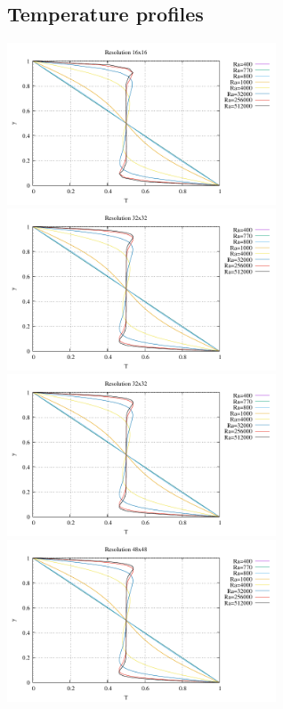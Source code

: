 \newpage
\subsection*{Temperature profiles}

\begin{center}
\includegraphics[width=8cm]{python_codes/md/results_new/profile_16x16}
\includegraphics[width=8cm]{python_codes/md/results_new/profile_32x32}\\
\includegraphics[width=8cm]{python_codes/md/results_new/profile_32x32}
\includegraphics[width=8cm]{python_codes/md/results_new/profile_48x48}
\end{center}

